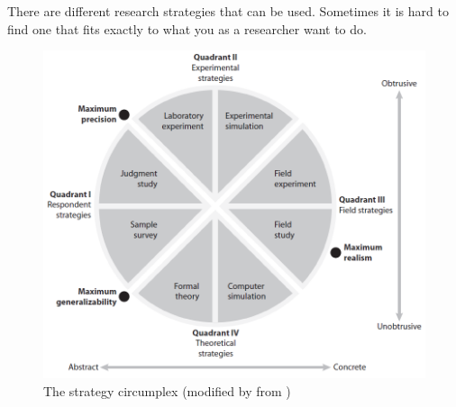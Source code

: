 There are different research strategies that can be used. Sometimes it is hard to find one that fits exactly to what you as a researcher want to do.
\begin{figure}
\begin{center}
\includegraphics[scale=0.5]{circumplex}
\caption[The strategy circumplex]{The strategy circumplex (modified by \cite{alsos} from \cite{McGrath})}
\label{fig:circumplex}
\end{center}
\end{figure} 
